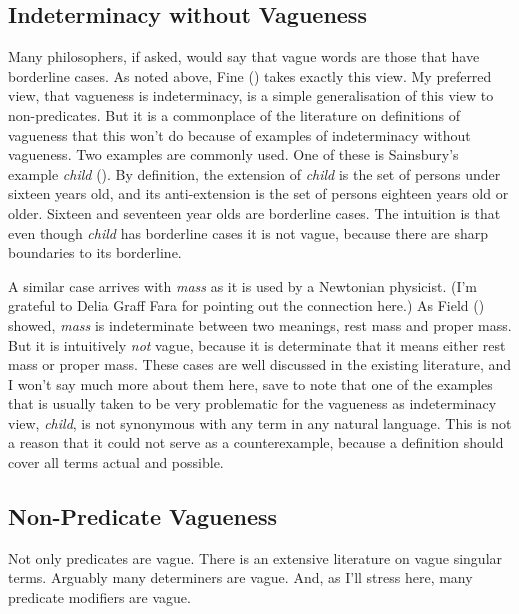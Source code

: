 \documentclass[
  11pt,
  letterpaper,
  DIV=11,
  numbers=noendperiod,
  twoside]{scrartcl}
\begin{document}
\subsection{Indeterminacy without
Vagueness}\label{indeterminacy-without-vagueness}

Many philosophers, if asked, would say that vague words are those that
have borderline cases. As noted above, Fine
() takes exactly this view. My preferred
view, that vagueness is indeterminacy, is a simple generalisation of
this view to non-predicates. But it is a commonplace of the literature
on definitions of vagueness that this won't do because of examples of
indeterminacy without vagueness. Two examples are commonly used. One of
these is Sainsbury's example \emph{child}
(). By definition, the
extension of \emph{child} is the set of persons under sixteen years old,
and its anti-extension is the set of persons eighteen years old or
older. Sixteen and seventeen year olds are borderline cases. The
intuition is that even though \emph{child} has borderline cases it is
not vague, because there are sharp boundaries to its borderline.

A similar case arrives with \emph{mass} as it is used by a Newtonian
physicist. (I'm grateful to Delia Graff Fara for pointing out the
connection here.) As Field () showed,
\emph{mass} is indeterminate between two meanings, rest mass and proper
mass. But it is intuitively \emph{not} vague, because it is determinate
that it means either rest mass or proper mass. These cases are well
discussed in the existing literature, and I won't say much more about
them here, save to note that one of the examples that is usually taken
to be very problematic for the vagueness as indeterminacy view,
\emph{child}, is not synonymous with any term in any natural language.
This is not a reason that it could not serve as a counterexample,
because a definition should cover all terms actual and possible.

\subsection{Non-Predicate Vagueness}\label{non-predicate-vagueness}

Not only predicates are vague. There is an extensive literature on vague
singular terms. Arguably many determiners are vague. And, as I'll stress
here, many predicate modifiers are vague.
\end{document}
